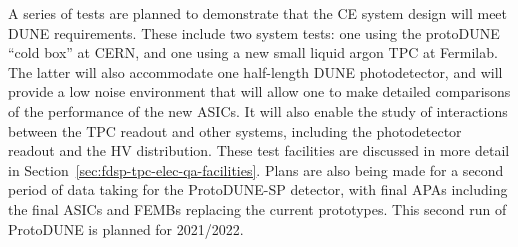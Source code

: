 A series of tests are planned to demonstrate that the CE system design will meet DUNE requirements. These include two system tests: one using the protoDUNE ``cold box'' at CERN, and one using a new small liquid argon TPC at Fermilab. The latter will also accommodate one half-length DUNE photodetector, and will provide a low noise environment that will allow one to make detailed comparisons of the performance of the new ASICs. It will also enable the study of interactions between the TPC readout and other systems, including the photodetector readout and the HV distribution. These test facilities are discussed in more detail in Section~\ref{sec:fdsp-tpc-elec-qa-facilities}. Plans are also being made for a second period of data taking for the ProtoDUNE-SP detector, with final APAs including the final ASICs and FEMBs replacing the current prototypes. This second run of ProtoDUNE is planned for 2021/2022.
